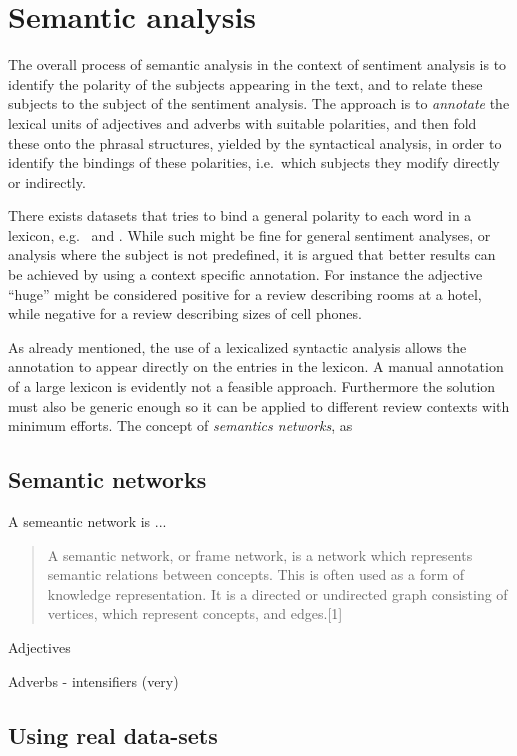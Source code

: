 
\section{Semantic analysis}
The overall process of semantic analysis in the context of sentiment analysis is to identify the polarity of the subjects appearing in the text, and to relate these subjects to the subject of the sentiment analysis. The approach is to \emph{annotate} the lexical units of adjectives and adverbs with suitable polarities, and then fold these onto the phrasal structures, yielded by the syntactical analysis, in order to identify the bindings of these polarities, i.e.\ which subjects they modify directly or indirectly.

There exists datasets that tries to bind a general polarity to each word in a lexicon, e.g.\ \cite{sentiWordNet} and \cite{sentiWordNet3}. While such might be fine for general sentiment analyses, or analysis where the subject is not predefined, it is argued that better results can be achieved by using a context specific annotation. For instance the adjective ``huge'' might be considered positive for a review describing rooms at a hotel, while negative for a review describing sizes of cell phones. 

As already mentioned, the use of a lexicalized syntactic analysis allows the annotation to appear directly on the entries in the lexicon. A manual annotation of a large lexicon is evidently not a feasible approach. Furthermore the solution must also be generic enough so it can be applied to different review contexts with minimum efforts. The concept of \emph{semantics networks}, as 
\cite[p.~454--456]{ai}
\subsection*{Semantic networks}
A semeantic network is ...
\begin{quote}
  A semantic network, or frame network, is a network which represents semantic relations between concepts. This is often used as a form of knowledge representation. It is a directed or undirected graph consisting of vertices, which represent concepts, and edges.[1]
\end{quote}

Adjectives 

Adverbs
- intensifiers (very)

\subsection*{Using real data-sets}

